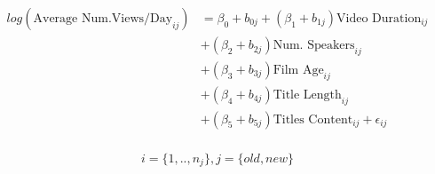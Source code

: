 \begin{align}
\begin{split}
log(\text{Average Num.Views/Day}_{ij})&=\beta_0+b_{0j}+(\beta_1+b_{1j})\text{Video Duration}_{ij}\\
&+(\beta_2+b_{2j})\text{Num. Speakers}_{ij}\\
&+(\beta_3+b_{3j})\text{Film Age}_{ij}\\
&+(\beta_4+b_{4j})\text{Title Length}_{ij}\\
&+(\beta_5+b_{5j})\text{Titles Content}_{ij}+\epsilon_{ij}\\
\end{split}
\label{poisson_mixed_times_eqn}
\end{align}

\begin{equation*}
i=\{1,..,n_j\}, j=\{old, new\}
\end{equation*}